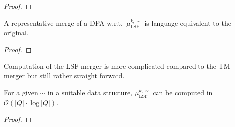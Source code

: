 \begin{proof}
\end{proof}

\begin{theorem}
	A representative merge of a DPA w.r.t.\ $\mu_\text{LSF}^{k,\sim}$ is language equivalent to the original.
\end{theorem}

\begin{proof}
\end{proof}

Computation of the LSF merger is more complicated compared to the TM merger but still rather straight forward.

\begin{theorem}
	For a given $\sim$ in a suitable data structure, $\mu_\text{LSF}^{k,\sim}$ can be computed in $\mathcal{O}(|Q| \cdot \log |Q|)$.
\end{theorem}

\begin{proof}
\end{proof}

